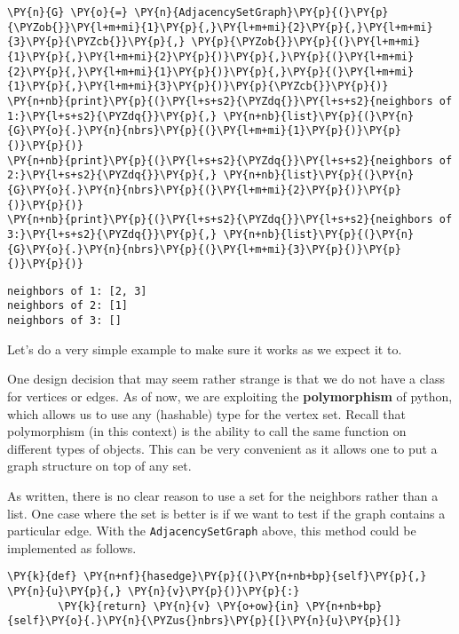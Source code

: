 \begin{Verbatim}[commandchars=\\\{\}]
\PY{n}{G} \PY{o}{=} \PY{n}{AdjacencySetGraph}\PY{p}{(}\PY{p}{\PYZob{}}\PY{l+m+mi}{1}\PY{p}{,}\PY{l+m+mi}{2}\PY{p}{,}\PY{l+m+mi}{3}\PY{p}{\PYZcb{}}\PY{p}{,} \PY{p}{\PYZob{}}\PY{p}{(}\PY{l+m+mi}{1}\PY{p}{,}\PY{l+m+mi}{2}\PY{p}{)}\PY{p}{,}\PY{p}{(}\PY{l+m+mi}{2}\PY{p}{,}\PY{l+m+mi}{1}\PY{p}{)}\PY{p}{,}\PY{p}{(}\PY{l+m+mi}{1}\PY{p}{,}\PY{l+m+mi}{3}\PY{p}{)}\PY{p}{\PYZcb{}}\PY{p}{)}
\PY{n+nb}{print}\PY{p}{(}\PY{l+s+s2}{\PYZdq{}}\PY{l+s+s2}{neighbors of 1:}\PY{l+s+s2}{\PYZdq{}}\PY{p}{,} \PY{n+nb}{list}\PY{p}{(}\PY{n}{G}\PY{o}{.}\PY{n}{nbrs}\PY{p}{(}\PY{l+m+mi}{1}\PY{p}{)}\PY{p}{)}\PY{p}{)}
\PY{n+nb}{print}\PY{p}{(}\PY{l+s+s2}{\PYZdq{}}\PY{l+s+s2}{neighbors of 2:}\PY{l+s+s2}{\PYZdq{}}\PY{p}{,} \PY{n+nb}{list}\PY{p}{(}\PY{n}{G}\PY{o}{.}\PY{n}{nbrs}\PY{p}{(}\PY{l+m+mi}{2}\PY{p}{)}\PY{p}{)}\PY{p}{)}
\PY{n+nb}{print}\PY{p}{(}\PY{l+s+s2}{\PYZdq{}}\PY{l+s+s2}{neighbors of 3:}\PY{l+s+s2}{\PYZdq{}}\PY{p}{,} \PY{n+nb}{list}\PY{p}{(}\PY{n}{G}\PY{o}{.}\PY{n}{nbrs}\PY{p}{(}\PY{l+m+mi}{3}\PY{p}{)}\PY{p}{)}\PY{p}{)}
\end{Verbatim}

\begin{Verbatim}
neighbors of 1: [2, 3]
neighbors of 2: [1]
neighbors of 3: []

\end{Verbatim}


Let's do a very simple example to make sure it works as we expect it to.


One design decision that may seem rather strange is that we do not have a class for vertices or edges.
As of now, we are exploiting the \textbf{polymorphism} of python, which allows us to use any (hashable) type for the vertex set.
Recall that polymorphism (in this context) is the ability to call the same function on different types of objects.
This can be very convenient as it allows one to put a graph structure on top of any set.


As written, there is no clear reason to use a set for the neighbors rather than a list.
One case where the set is better is if we want to test if the graph contains a particular edge.  With the \texttt{AdjacencySetGraph} above, this method could be implemented as follows.

\begin{Verbatim}[commandchars=\\\{\}]
    \PY{k}{def} \PY{n+nf}{hasedge}\PY{p}{(}\PY{n+nb+bp}{self}\PY{p}{,} \PY{n}{u}\PY{p}{,} \PY{n}{v}\PY{p}{)}\PY{p}{:}
        \PY{k}{return} \PY{n}{v} \PY{o+ow}{in} \PY{n+nb+bp}{self}\PY{o}{.}\PY{n}{\PYZus{}nbrs}\PY{p}{[}\PY{n}{u}\PY{p}{]}
\end{Verbatim}



